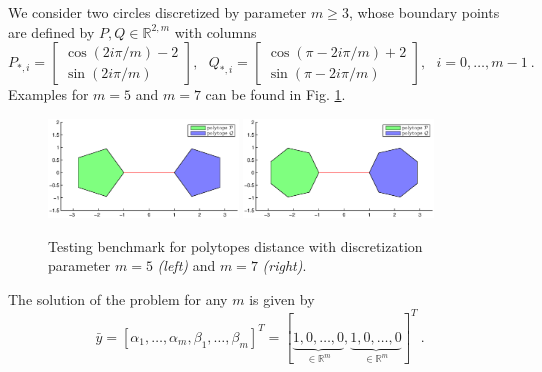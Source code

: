 \documentclass{article}
\theoremstyle{definition}
\begin{document}
We consider two circles discretized by parameter $m \geq 3$, whose boundary points are defined by $P, Q \in \mathbb{R}^{2,m}$
with columns
\begin{displaymath}
 P_{\ast,i} = 
 \left[
  \begin{array}{c}
   \cos (2i\pi / m ) - 2  \\
   \sin (2i\pi / m ) 
  \end{array}
 \right]
 , ~~~
 Q_{\ast,i} = 
 \left[
  \begin{array}{c}
   \cos (\pi - 2i\pi / m ) + 2 \\
   \sin (\pi - 2i\pi / m ) 
  \end{array}
 \right], ~~~
 i = 0,\dots,m-1 ~\mathrm{.} 
\end{displaymath}
Examples for $m = 5$ and $m=7$ can be found in Fig. \ref{fig:polytope1}.

\begin{figure}[h!]
\begin{center}
\includegraphics[width=0.45\textwidth]{polytope_n5.eps}
\includegraphics[width=0.45\textwidth]{polytope_n7.eps}
\caption[Polytope distance: testing benchmark]{Testing benchmark for polytopes distance with discretization parameter $m = 5$ \emph{(left)} and $m = 7$ \emph{(right)}.}
\label{fig:polytope1}
\end{center}
\end{figure}

The solution of the problem for any $m$ is given by
\begin{displaymath}
 \bar{y} =
 \left[
  \alpha_1, \dots, \alpha_m, \beta_1, \dots, \beta_m
 \right]^T = 
 [\underbrace{1 , 0, \dots, 0}_{\in \mathbb{R}^m}, \underbrace{1 , 0, \dots, 0}_{\in \mathbb{R}^m}]^T ~\mathrm{.}  
\end{displaymath}
\end{document}
